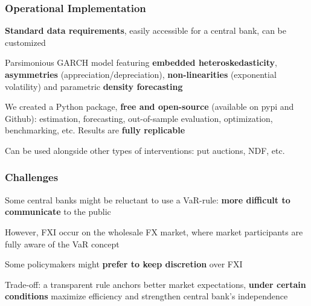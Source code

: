 \documentclass{beamer}
\newenvironment{wideitemize}{\itemize\addtolength{\itemsep}{10pt}}{\enditemize}
\begin{document}
\begin{frame}
  \frametitle{Operational Implementation}
  \begin{wideitemize}
  \item \textbf{Standard data requirements}, easily accessible for a central
    bank, can be customized
  \item Parsimonious GARCH model featuring \textbf{embedded heteroskedasticity},  \textbf{asymmetries}
    (appreciation/depreciation), \textbf{non-linearities} (exponential
    volatility) and parametric \textbf{density forecasting}    
  \item We created a Python package, \textbf{free and open-source}  (available on pypi and Github): estimation, forecasting,
    out-of-sample evaluation, optimization, benchmarking, etc. Results are \textbf{fully replicable}
  \item Can be used alongside other types of interventions: put auctions, NDF, etc.
  \end{wideitemize}
\end{frame}


\begin{frame}
  \frametitle{Challenges}
  \begin{wideitemize}
      \item Some central banks might be reluctant to use a VaR-rule: \textbf{more
        difficult to communicate} to the public
        \begin{wideitemize}
      \item However, FXI occur on the wholesale FX market, where market
        participants are fully aware of the VaR concept
        \end{wideitemize}        
      \item Some policymakers might \textbf{prefer to keep discretion} over FXI
        \begin{wideitemize}
    \item Trade-off: a transparent rule anchors better market expectations,
      \textbf{under certain conditions }maximize efficiency  and strengthen central bank's independence
        \end{wideitemize}        
  \end{wideitemize}
\end{frame}
\end{document}
